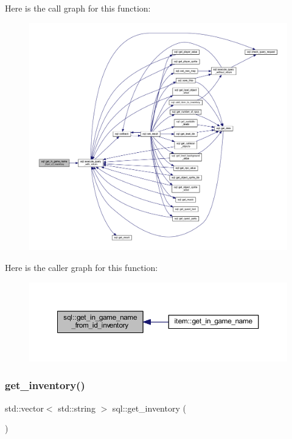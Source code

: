 Here is the call graph for this function\+:
\nopagebreak
\begin{figure}[H]
\begin{center}
\leavevmode
\includegraphics[width=350pt]{classsql_a62cd4910a9310621ca22fb3c322f52a4_cgraph}
\end{center}
\end{figure}
Here is the caller graph for this function\+:
\nopagebreak
\begin{figure}[H]
\begin{center}
\leavevmode
\includegraphics[width=350pt]{classsql_a62cd4910a9310621ca22fb3c322f52a4_icgraph}
\end{center}
\end{figure}
\mbox{\label{classsql_a7f818b967453b1ae15ce4c5b28cf4765}} 
\subsubsection{\texorpdfstring{get\+\_\+inventory()}{get\_inventory()}}
{\footnotesize\ttfamily std\+::vector$<$ std\+::string $>$ sql\+::get\+\_\+inventory (\begin{DoxyParamCaption}{ }\end{DoxyParamCaption})}



